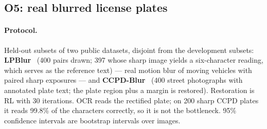 \subsection{O5: real blurred license plates}
\label{sec:real}
\paragraph{Protocol.} Held-out subsets of two public datasets, disjoint from the development subsets:
\textbf{LPBlur}~\cite{lpblur2024} (400 pairs drawn; 397 whose sharp image yields a six-character
reading, which serves as the reference text) --- real motion blur of moving vehicles with paired
sharp exposures --- and \textbf{CCPD-Blur}~\cite{ccpd2018} (400 street photographs with annotated
plate text; the plate region plus a margin is restored). Restoration is RL with 30 iterations. OCR
reads the rectified plate; on 200 sharp CCPD plates it reads 99.8\% of the characters correctly,
so it is not the bottleneck. 95\% confidence intervals are bootstrap intervals over images.

\begin{table}[h]
\centering\small
{}
\caption{Held-out real plates. \emph{char.\ acc.}: OCR character accuracy (95\% CIs: LPBlur
blurred 0.149--0.203, text-aware 0.459--0.536, text-aware + gate 0.366--0.447; CCPD blurred
0.730--0.786, text-aware + gate 0.652--0.718). \emph{exact}: whole plate read correctly.
\emph{worse}: images whose OCR accuracy drops. LPBlur accepted rates: baseline + gate 10\%,
text-aware + gate 43\%, strict 24\%.}
\label{tab:real}
\end{table}

